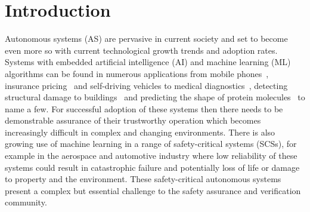 % 


\section{Introduction}

Autonomous systems (AS) are pervasive in current society and set to become even more so with current technological growth trends and adoption rates. Systems with embedded artificial intelligence (AI) and machine learning (ML) algorithms can be found in numerous applications from mobile phones~\cite{mediumaiphones}, insurance pricing~\cite{kuo2020towards} and self-driving vehicles %
to medical diagnostics~\cite{kononenko2001machine}, detecting structural damage to buildings~\cite{avci2021review} and predicting the shape of protein molecules~\cite{alpha_fold} to name a few.
%
For successful adoption of these systems then there needs to be demonstrable assurance of their trustworthy operation which becomes increasingly difficult in complex and changing environments.  
%
There is also growing use of machine learning in a range of safety-critical systems (SCSs), for example in the aerospace and automotive industry where low reliability of these systems could result in catastrophic failure and potentially loss of life or damage to property and the environment. These safety-critical autonomous systems present a complex but essential challenge to the safety assurance and verification community. 

